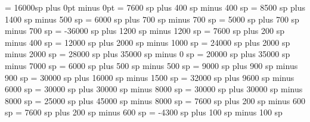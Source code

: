 
\greadditionallineswidth = 16000sp
\grezerowidthspace=0pt plus 0pt minus 0pt
\greinterglyphspace = 7600 sp plus 400 sp minus 400 sp
\grealterationspace = 8500 sp plus 1400 sp minus 500 sp
\greclefflatspace = 6000 sp plus 700 sp minus 700 sp
\grebeforechoralsignspace = 5000 sp plus 700 sp minus 700 sp
\grebeforealterationspace = -36000 sp plus 1200 sp minus 1200 sp
\greinterelementspace = 7600 sp plus 200 sp minus 400 sp
\grelargerspace = 12000 sp plus 2000 sp minus 1000 sp
\greglyphspace = 24000 sp plus 2000 sp minus 2000 sp
\greintersyllablespace= 28000 sp plus 35000 sp minus 0 sp
\grespacebeforecusto = 20000 sp plus 35000 sp minus 7000 sp
\grespacebeforesigns= 6000 sp plus 500 sp minus 500 sp
\grespaceaftersigns= 9000 sp plus 900 sp minus 900 sp
\grespaceafterlineclef = 30000 sp plus 16000 sp minus 1500 sp
\greinterwordspacenotes = 32000 sp plus 9600 sp minus 6000 sp
\greinterwordspacenotestext = 30000 sp plus 30000 sp minus 8000 sp
\greinterwordspacetextnotes = 30000 sp plus 30000 sp minus 8000 sp
\greinterwordspacetext = 25000 sp plus 45000 sp minus 8000 sp
\grebitrivirspace = 7600 sp plus 200 sp minus 600 sp
\grebitristrospace = 7600 sp plus 200 sp minus 600 sp
\grepunctuminclinatumshift= -4300 sp plus 100 sp minus 100 sp
